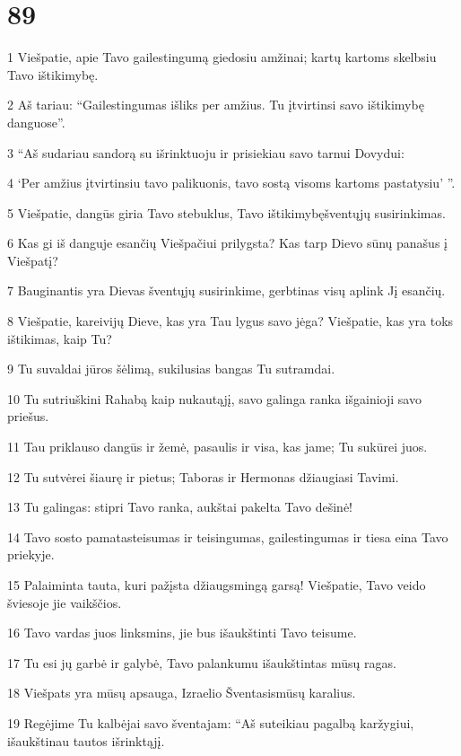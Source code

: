 \chapter{89}


\par 1 Viešpatie, apie Tavo gailestingumą giedosiu amžinai; kartų kartoms skelbsiu Tavo ištikimybę. 
\par 2 Aš tariau: “Gailestingumas išliks per amžius. Tu įtvirtinsi savo ištikimybę danguose”. 
\par 3 “Aš sudariau sandorą su išrinktuoju ir prisiekiau savo tarnui Dovydui: 
\par 4 ‘Per amžius įtvirtinsiu tavo palikuonis, tavo sostą visoms kartoms pastatysiu’ ”. 
\par 5 Viešpatie, dangūs giria Tavo stebuklus, Tavo ištikimybę­šventųjų susirinkimas. 
\par 6 Kas gi iš danguje esančių Viešpačiui prilygsta? Kas tarp Dievo sūnų panašus į Viešpatį? 
\par 7 Bauginantis yra Dievas šventųjų susirinkime, gerbtinas visų aplink Jį esančių. 
\par 8 Viešpatie, kareivijų Dieve, kas yra Tau lygus savo jėga? Viešpatie, kas yra toks ištikimas, kaip Tu? 
\par 9 Tu suvaldai jūros šėlimą, sukilusias bangas Tu sutramdai. 
\par 10 Tu sutriuškini Rahabą kaip nukautąjį, savo galinga ranka išgainioji savo priešus. 
\par 11 Tau priklauso dangūs ir žemė, pasaulis ir visa, kas jame; Tu sukūrei juos. 
\par 12 Tu sutvėrei šiaurę ir pietus; Taboras ir Hermonas džiaugiasi Tavimi. 
\par 13 Tu galingas: stipri Tavo ranka, aukštai pakelta Tavo dešinė! 
\par 14 Tavo sosto pamatas­teisumas ir teisingumas, gailestingumas ir tiesa eina Tavo priekyje. 
\par 15 Palaiminta tauta, kuri pažįsta džiaugsmingą garsą! Viešpatie, Tavo veido šviesoje jie vaikščios. 
\par 16 Tavo vardas juos linksmins, jie bus išaukštinti Tavo teisume. 
\par 17 Tu esi jų garbė ir galybė, Tavo palankumu išaukštintas mūsų ragas. 
\par 18 Viešpats yra mūsų apsauga, Izraelio Šventasis­mūsų karalius. 
\par 19 Regėjime Tu kalbėjai savo šventajam: “Aš suteikiau pagalbą karžygiui, išaukštinau tautos išrinktąjį. 
